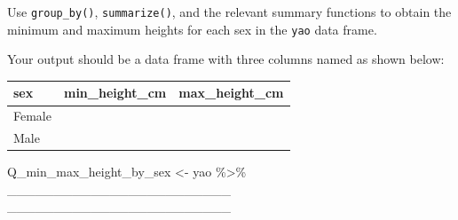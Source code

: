 \documentclass[
  letterpaper,
  DIV=11,
  numbers=noendperiod]{scrreprt}
\newenvironment{Shaded}{\begin{snugshade}}{\end{snugshade}}
\newcommand{\NormalTok}[1]{\textcolor[rgb]{0.00,0.23,0.31}{#1}}
\newcommand{\OtherTok}[1]{\textcolor[rgb]{0.00,0.23,0.31}{#1}}
\newcommand{\SpecialCharTok}[1]{\textcolor[rgb]{0.37,0.37,0.37}{#1}}
\begin{document}
\begin{tcolorbox}[enhanced jigsaw, title=\textcolor{quarto-callout-tip-color}{\faLightbulb}\hspace{0.5em}{Practice}, colbacktitle=quarto-callout-tip-color!10!white, leftrule=.75mm, arc=.35mm, opacityback=0, bottomrule=.15mm, rightrule=.15mm, toptitle=1mm, breakable, toprule=.15mm, colback=white, coltitle=black, colframe=quarto-callout-tip-color-frame, bottomtitle=1mm, titlerule=0mm, left=2mm, opacitybacktitle=0.6]

Use \texttt{group\_by()}, \texttt{summarize()}, and the relevant summary
functions to obtain the minimum and maximum heights for each sex in the
\texttt{yao} data frame.

Your output should be a data frame with three columns named as shown
below:

\begin{longtable}[]{@{}lll@{}}
\toprule\noalign{}
sex & min\_height\_cm & max\_height\_cm \\
\midrule\noalign{}
\endhead
\bottomrule\noalign{}
\endlastfoot
Female & & \\
Male & & \\
\end{longtable}

\begin{Shaded}
\begin{Highlighting}[]
\NormalTok{Q\_min\_max\_height\_by\_sex }\OtherTok{\textless{}{-}} 
\NormalTok{  yao }\SpecialCharTok{\%\textgreater{}\%} 
\NormalTok{  \_\_\_\_\_\_\_\_\_\_\_\_\_\_\_\_\_\_\_\_\_\_\_\_}
\NormalTok{  \_\_\_\_\_\_\_\_\_\_\_\_\_\_\_\_\_\_\_\_\_\_\_\_}
\end{Highlighting}
\end{Shaded}

\end{tcolorbox}
\end{document}
